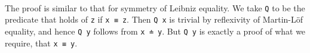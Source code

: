 \begin{fence}
\begin{code}%
\>[0]\AgdaSpace{}%
\AgdaSymbol{:}\AgdaSpace{}%
\AgdaSpace{}%
\AgdaSymbol{\{}\AgdaSpace{}%
\AgdaSymbol{:}\AgdaSpace{}%
\AgdaSymbol{\}}\AgdaSpace{}%
\AgdaSymbol{\{}\AgdaSpace{}%
\AgdaSpace{}%
\AgdaSymbol{:}\AgdaSpace{}%
\AgdaSymbol{\}}\<%
\\
\>[0][@{}l@{\AgdaIndent{0}}]%
\>[2]%
\>[655I]\AgdaSpace{}%
\AgdaSpace{}%
\<%
\\
\>[.][@{}l@{}]\<[655I]%
\>[4]\AgdaComment{-----}\<%
\\
%
\>[2]\AgdaSpace{}%
\AgdaSpace{}%
\AgdaSpace{}%
\<%
\\
\>[0]\AgdaSpace{}%
\AgdaSymbol{\{}\AgdaSymbol{\}}\AgdaSpace{}%
\AgdaSymbol{\{}\AgdaSymbol{\}}\AgdaSpace{}%
\AgdaSymbol{\{}\AgdaSymbol{\}}\AgdaSpace{}%
%
\>[29]\AgdaSymbol{=}%
\>[32]\<%
\\
\>[0][@{}l@{\AgdaIndent{0}}]%
\>[2]\<%
\\
\>[2][@{}l@{\AgdaIndent{0}}]%
\>[4]\AgdaSpace{}%
\AgdaSymbol{:}\AgdaSpace{}%
\AgdaSpace{}%
\AgdaSpace{}%
\<%
\\
%
\>[4]\AgdaSpace{}%
\AgdaSpace{}%
\AgdaSymbol{=}\AgdaSpace{}%
\AgdaSpace{}%
\AgdaSpace{}%
\<%
\\
%
\>[4]\AgdaSpace{}%
\AgdaSymbol{:}\AgdaSpace{}%
\AgdaSpace{}%
\<%
\\
%
\>[4]\AgdaSpace{}%
\AgdaSymbol{=}\AgdaSpace{}%
\<%
\\
%
\>[4]\AgdaSpace{}%
\AgdaSymbol{:}\AgdaSpace{}%
\AgdaSpace{}%
\<%
\\
%
\>[4]\AgdaSpace{}%
\AgdaSymbol{=}\AgdaSpace{}%
\AgdaSpace{}%
\AgdaSpace{}%
\<%
\end{code}
\end{fence}

The proof is similar to that for symmetry of Leibniz equality. We take
\texttt{Q} to be the predicate that holds of \texttt{z} if
\texttt{x\ ≡\ z}. Then \texttt{Q\ x} is trivial by reflexivity of
Martin-Löf equality, and hence \texttt{Q\ y} follows from
\texttt{x\ ≐\ y}. But \texttt{Q\ y} is exactly a proof of what we
require, that \texttt{x\ ≡\ y}.

